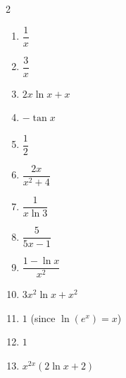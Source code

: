 \documentclass[11pt]{article}
\begin{document}
\begin{keybox}
\begin{multicols}{2}
\small
\begin{enumerate}[leftmargin=*,itemsep=3pt]
  \item $\dfrac1x$
  \item $\dfrac3x$
  \item $2x\ln x+x$
  \item $-\tan x$
  \item $\dfrac12$
  \item $\dfrac{2x}{x^2+4}$
  \item $\dfrac1{x\ln 3}$
  \item $\dfrac5{5x-1}$
  \item $\dfrac{1-\ln x}{x^2}$
  \item $3x^2\ln x+x^2$
  \item $1$ (since $\ln(e^x)=x$)
  \item $1$
  \item $x^{2x}(2\ln x+2)$
\end{enumerate}
\end{multicols}
\end{keybox}
\end{document}
